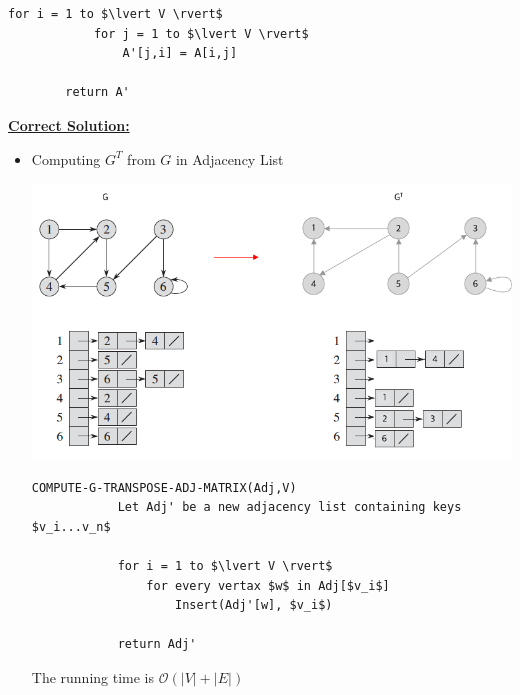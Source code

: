 \documentclass[12pt]{article}
\begin{document}
\begin{enumerate}[1.]
\begin{itemize}
\begin{lstlisting}[mathescape=true]
        for i = 1 to $\lvert V \rvert$
            for j = 1 to $\lvert V \rvert$
                A'[j,i] = A[i,j]

        return A'
    \end{lstlisting}

    \bigskip

    \end{itemize}

    \bigskip


    \begin{mdframed}
        \underline{\textbf{Correct Solution:}}

        \bigskip

        \begin{itemize}
            \item Computing $G^T$ from $G$ in Adjacency List

            \begin{center}
            \includegraphics[width=\linewidth]{images/worksheet_4_solution_18.png}
            \end{center}

        \begin{lstlisting}[mathescape=true]
        COMPUTE-G-TRANSPOSE-ADJ-MATRIX(Adj,V)
            Let Adj' be a new adjacency list containing keys $v_i...v_n$

            for i = 1 to $\lvert V \rvert$
                for every vertax $w$ in Adj[$v_i$]
                    Insert(Adj'[w], $v_i$)

            return Adj'
        \end{lstlisting}

            \bigskip

            \color{red}The running time is $\mathcal{O}(\lvert V \rvert + \lvert E \rvert)$\color{black}


\end{itemize}
\end{mdframed}
\end{enumerate}
\end{document}
